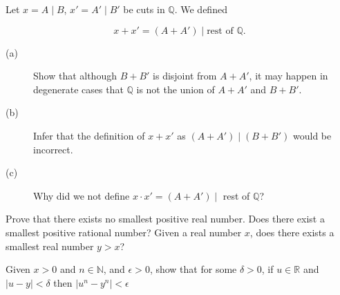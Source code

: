 \documentclass[11pt]{article}
\begin{document}

\begin{exercise}
Let $x=A\mid B$, $x'=A'\mid B'$ be cuts in $\mathbb{Q}$. We defined

\[
x+x'=(A+A')\mid\text{rest of }\mathbb{Q}.
\]

\begin{description}
    \item[(a)] Show that although $B+B'$ is disjoint from $A+A'$, it may happen in degenerate cases that $\mathbb{Q}$ is not the union of $A+A'$ and $B+B'$.
    \item[(b)] Infer that the definition of $x+x'$ as $(A+A') \mid (B+B')$ would be incorrect. 
    \item[(c)] Why did we not define $x \cdot x' = (A+A') \mid$ rest of $\mathbb{Q}$?  
\end{description}

\end{exercise}

\begin{solution}

\end{solution}


\begin{exercise}
Prove that there exists no smallest positive real number. Does there exist a smallest positive rational number? Given a real number $x$, does there exists a smallest real number $y > x$?
\end{exercise}

\begin{solution}

\end{solution}


\begin{exercise}
    Given $x>0$ and $n \in \mathbb{N}$, and $\epsilon > 0$, show that for some $\delta > 0$, if $u \in \mathbb{R}$ and $|u-y| < \delta$ then $|u^n-y^n| < \epsilon$ 
\end{exercise}

\begin{solution}

\end{solution}
\end{document}
